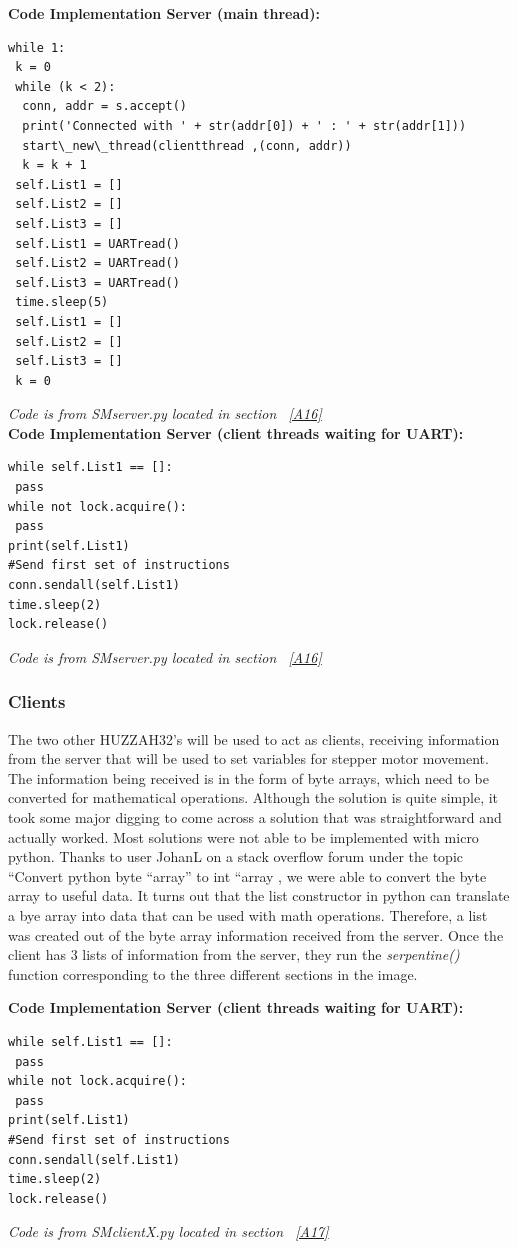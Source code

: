 \noindent \textbf{Code Implementation Server (main thread):}
\begin{lstlisting}
while 1:
 k = 0
 while (k < 2):
  conn, addr = s.accept()
  print('Connected with ' + str(addr[0]) + ' : ' + str(addr[1]))
  start\_new\_thread(clientthread ,(conn, addr))
  k = k + 1
 self.List1 = []
 self.List2 = []
 self.List3 = []
 self.List1 = UARTread()
 self.List2 = UARTread()
 self.List3 = UARTread()
 time.sleep(5)
 self.List1 = []
 self.List2 = []
 self.List3 = []
 k = 0
\end{lstlisting}
\textit{Code is from SMserver.py located in section ~\ref{A16}}\\

\noindent \textbf{Code Implementation Server (client threads waiting for UART):}
\begin{lstlisting}
while self.List1 == []:
 pass  
while not lock.acquire():
 pass
print(self.List1)  
#Send first set of instructions
conn.sendall(self.List1)
time.sleep(2)
lock.release()
\end{lstlisting}
\textit{Code is from SMserver.py located in section ~\ref{A16}}\\

\subsubsection{Clients}
The two other HUZZAH32's will be used to act as clients, receiving information from the server that will be used to set variables for stepper motor movement. The information being received is in the form of byte arrays, which need to be converted for mathematical operations. Although the solution is quite simple, it took some major digging to come across a solution that was straightforward and actually worked. Most solutions were not able to be implemented with micro python. Thanks to user JohanL on a stack overflow forum under the topic ``Convert python byte ``array'' to int ``array \cite{JohanL}, we were able to convert the byte array to useful data. It turns out that the list constructor in python can translate a bye array into data that can be used with math operations. Therefore, a list was created out of the byte array information received from the server. Once the client has 3 lists of information from the server, they run the \textit{serpentine()} function corresponding to the three different sections in the image.

\noindent \textbf{Code Implementation Server (client threads waiting for UART):}
\begin{lstlisting}
while self.List1 == []:
 pass  
while not lock.acquire():
 pass
print(self.List1)  
#Send first set of instructions
conn.sendall(self.List1)
time.sleep(2)
lock.release()
\end{lstlisting}
\textit{Code is from SMclientX.py located in section ~\ref{A17}}\\

